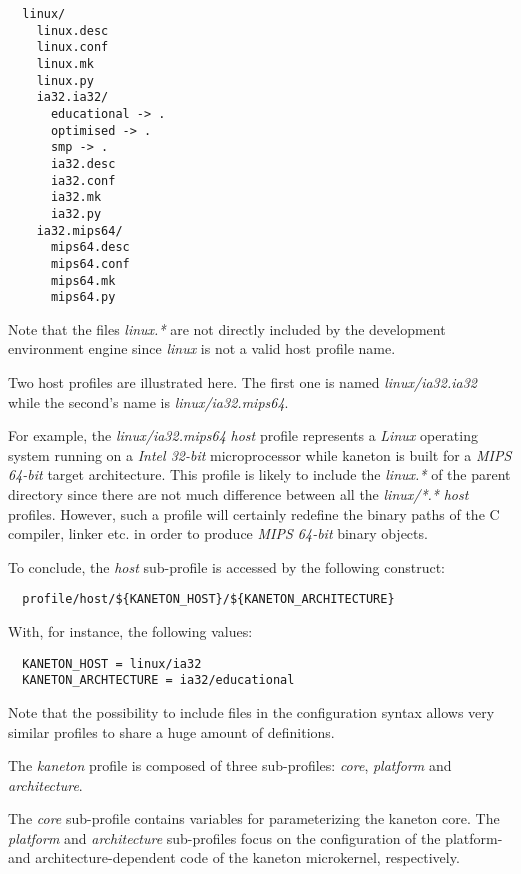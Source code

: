 \begin{verbatim}
  linux/
    linux.desc
    linux.conf
    linux.mk
    linux.py
    ia32.ia32/
      educational -> .
      optimised -> .
      smp -> .
      ia32.desc
      ia32.conf
      ia32.mk
      ia32.py
    ia32.mips64/
      mips64.desc
      mips64.conf
      mips64.mk
      mips64.py
\end{verbatim}

Note that the files \textit{linux.*} are not directly included by the
development environment engine since \textit{linux} is not a valid host
profile name.

Two host profiles are illustrated here. The first one is named
\textit{linux/ia32.ia32} while the second's name is \textit{linux/ia32.mips64}.

For example, the \textit{linux/ia32.mips64} \textit{host} profile represents a
\textit{Linux} operating system running on a \textit{Intel 32-bit}
microprocessor while kaneton is built for a \textit{MIPS 64-bit} target
architecture. This profile is likely to include the \textit{linux.*} of the
parent directory since there are not much difference between all the
\textit{linux/*.*} \textit{host} profiles. However, such a profile will
certainly redefine the binary paths of the C compiler, linker etc. in order
to produce \textit{MIPS 64-bit} binary objects.

To conclude, the \textit{host} sub-profile is accessed by the following
construct:

\begin{verbatim}
  profile/host/${KANETON_HOST}/${KANETON_ARCHITECTURE}
\end{verbatim}

With, for instance, the following values:

\begin{verbatim}
  KANETON_HOST = linux/ia32
  KANETON_ARCHTECTURE = ia32/educational
\end{verbatim}

Note that the possibility to include files in the configuration syntax allows
very similar profiles to share a huge amount of definitions.



The \textit{kaneton} profile is composed of three sub-profiles: \textit{core},
\textit{platform} and \textit{architecture}.

The \textit{core} sub-profile contains variables for parameterizing the
kaneton core. The \textit{platform} and \textit{architecture} sub-profiles
focus on the configuration of the platform- and architecture-dependent code
of the kaneton microkernel, respectively.

